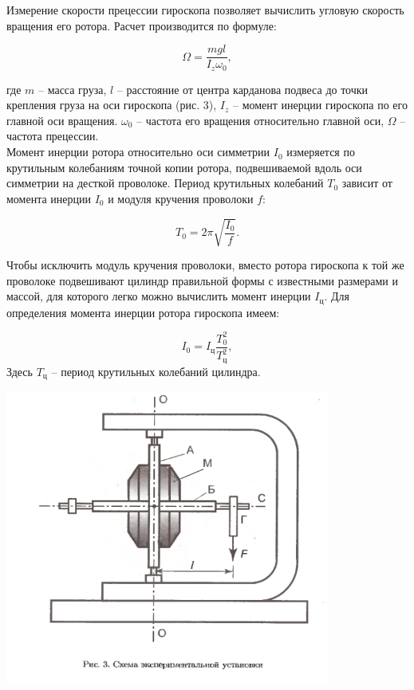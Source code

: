 \documentclass[a4paper,12pt]{article}
\begin{document}
	Измерение скорости прецессии гироскопа позволяет вычислить угловую скорость вращения его ротора. Расчет производится по формуле:
	
	\begin{equation}
		\Omega = \frac{mgl}{I_z\omega_0},
	\end{equation}
	
	где $m$ -- масса груза, $l$ -- расстояние от центра карданова подвеса до точки крепления груза на оси гироскопа (рис. 3), $I_z$ -- момент инерции гироскопа по его главной оси вращения. $\omega_0$ -- частота его вращения относительно главной оси, $\Omega$ -- частота прецессии.\\
	Момент инерции ротора относительно оси симметрии $I_0$ измеряется по крутильным колебаниям точной копии ротора, подвешиваемой вдоль оси симметрии на десткой проволоке. Период крутильных колебаний $T_0$ зависит от момента инерции $I_0$ и модуля кручения проволоки $f$:
	
	\begin{equation}
		T_0 = 2\pi\sqrt{\frac{I_0}{f}}.
	\end{equation}
	
	Чтобы исключить модуль кручения проволоки, вместо ротора гироскопа к той же проволоке подвешивают цилиндр правильной формы с известными размерами и массой, для которого легко можно вычислить момент инерции $I_\text{ц}$. Для определения момента инерции ротора гироскопа имеем:
	
	\begin{equation}
		I_0 = I_\text{ц}\frac{T_0^2}{T_\text{ц}^2},
		\label{moment}
	\end{equation}
	Здесь $T_\text{ц}$ -- период крутильных колебаний цилиндра.\\
	\begin{center}
		\includegraphics[width=0.8\textwidth]{img3.png}
	\end{center}
	
\end{document}
